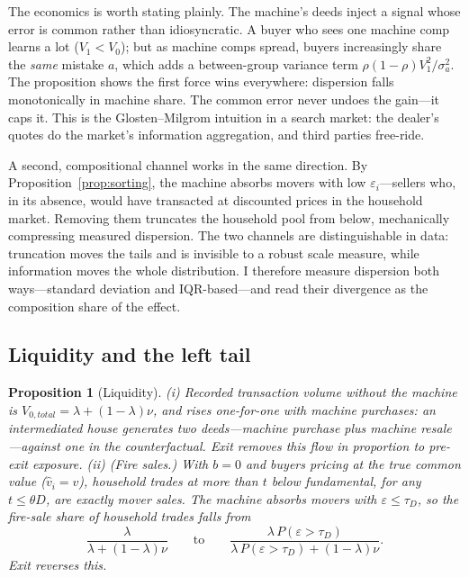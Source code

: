 \documentclass[12pt, letterpaper]{article}
\newtheorem{proposition}{Proposition}
\theoremstyle{remark}
\begin{document}
The economics is worth stating plainly. The machine's deeds inject a signal whose error is common rather than idiosyncratic. A buyer who sees one machine comp learns a lot ($V_1 < V_0$); but as machine comps spread, buyers increasingly share the \emph{same} mistake $a$, which adds a between-group variance term $\rho(1-\rho)V_1^2/\sigma_a^2$. The proposition shows the first force wins everywhere: dispersion falls monotonically in machine share. The common error never undoes the gain---it caps it. This is the Glosten--Milgrom intuition in a search market: the dealer's quotes do the market's information aggregation, and third parties free-ride.

A second, compositional channel works in the same direction. By Proposition~\ref{prop:sorting}, the machine absorbs movers with low $\varepsilon_i$---sellers who, in its absence, would have transacted at discounted prices in the household market. Removing them truncates the household pool from below, mechanically compressing measured dispersion. The two channels are distinguishable in data: truncation moves the tails and is invisible to a robust scale measure, while information moves the whole distribution. I therefore measure dispersion both ways---standard deviation and IQR-based---and read their divergence as the composition share of the effect.

\subsection{Liquidity and the left tail}\label{sec:model-liquidity}

\begin{proposition}[Liquidity]\label{prop:liquidity}
(i) Recorded transaction volume without the machine is $V_{0,total} = \lambda + (1 - \lambda)\nu$, and rises one-for-one with machine purchases: an intermediated house generates two deeds---machine purchase plus machine resale---against one in the counterfactual. Exit removes this flow in proportion to pre-exit exposure.
(ii) (Fire sales.) With $b = 0$ and buyers pricing at the true common value ($\hat v_i = v$), household trades at more than $t$ below fundamental, for any $t \le \theta D$, are exactly mover sales. The machine absorbs movers with $\varepsilon \le \tau_D$, so the fire-sale share of household trades falls from
\begin{equation}
\frac{\lambda}{\lambda + (1-\lambda)\nu}
\qquad \text{to} \qquad
\frac{\lambda \, P(\varepsilon > \tau_D)}{\lambda \, P(\varepsilon > \tau_D) + (1-\lambda)\nu}.
\label{eq:firesale}
\end{equation}
Exit reverses this.
\end{proposition}
\end{document}
